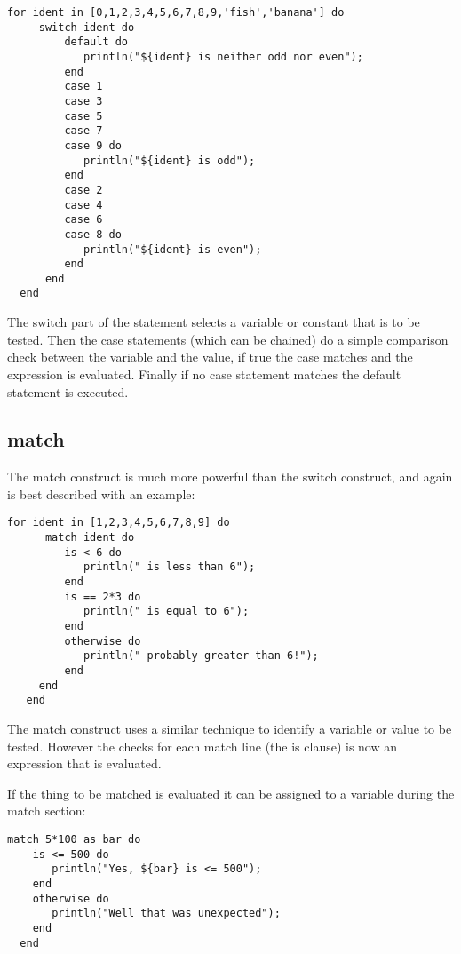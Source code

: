 \begin{lstlisting}[caption={switch construct}]
  for ident in [0,1,2,3,4,5,6,7,8,9,'fish','banana'] do
     switch ident do
         default do
            println("${ident} is neither odd nor even");
         end
         case 1
         case 3
         case 5
         case 7
         case 9 do
            println("${ident} is odd");
         end
         case 2
         case 4
         case 6
         case 8 do
            println("${ident} is even");
         end
      end
  end
\end{lstlisting}

The switch part of the statement selects a variable or constant that is to be tested. Then the
case statements (which can be chained) do a simple comparison check between the variable and the
value, if true the case matches and the expression is evaluated. Finally if no case statement matches
the default statement is executed.

\subsection{match}
The match construct is much more powerful than the switch construct, and again is best described with
an example:

\begin{lstlisting}[caption={match construct}]
   for ident in [1,2,3,4,5,6,7,8,9] do
      match ident do
         is < 6 do
            println(" is less than 6");
         end
         is == 2*3 do
            println(" is equal to 6");
         end
         otherwise do
            println(" probably greater than 6!");
         end
     end
   end
\end{lstlisting}

The match construct uses a similar technique to identify a variable or value to be tested. However the
checks for each match line (the is clause) is now an expression that is evaluated.

If the thing to be matched is evaluated it can be assigned to a variable during the match section:

\begin{lstlisting}[caption={match construct assign}]
  match 5*100 as bar do
    is <= 500 do
       println("Yes, ${bar} is <= 500");
    end
    otherwise do
       println("Well that was unexpected");
    end
  end
\end{lstlisting}
